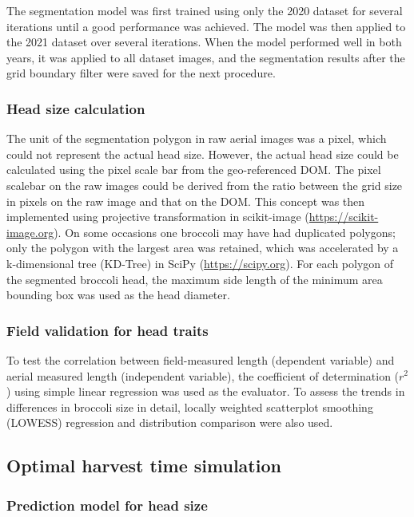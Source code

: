 The segmentation model was first trained using only the 2020 dataset for several iterations until a good performance was achieved. The model was then applied to the 2021 dataset over several iterations. When the model performed well in both years, it was applied to all dataset images, and the segmentation results after the grid boundary filter were saved for the next procedure.

\subsubsection*{Head size calculation}

The unit of the segmentation polygon in raw aerial images was a pixel, which could not represent the actual head size. However, the actual head size could be calculated using the pixel scale bar from the geo-referenced DOM. The pixel scalebar on the raw images could be derived from the ratio between the grid size in pixels on the raw image and that on the DOM. This concept was then implemented using projective transformation in scikit-image (\url{https://scikit-image.org}). On some occasions one broccoli may have had duplicated polygons; only the polygon with the largest area was retained, which was accelerated by a k-dimensional tree (KD-Tree) in SciPy (\url{https://scipy.org}). For each polygon of the segmented broccoli head, the maximum side length of the minimum area bounding box was used as the head diameter.

\subsubsection*{Field validation for head traits}

To test the correlation between field-measured length (dependent variable) and aerial measured length (independent variable), the coefficient of determination ($r^2$) using simple linear regression was used as the evaluator. To assess the trends in differences in broccoli size in detail, locally weighted scatterplot smoothing (LOWESS) regression and distribution comparison were also used.

\subsection{Optimal harvest time simulation}

\subsubsection*{Prediction model for head size}

